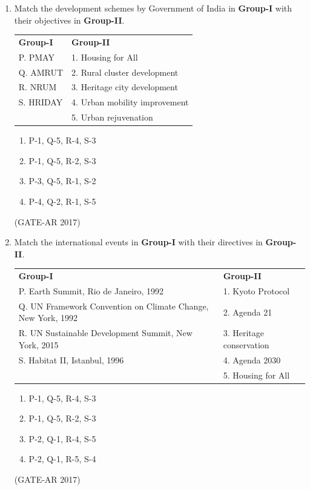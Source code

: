 \documentclass[a4paper,10pt]{article}
\begin{document}
\begin{enumerate}
    \item Match the development schemes by Government of India in \textbf{Group-I} with their objectives in \textbf{Group-II}. \\
    \begin{tabular}{ l l }
	\textbf{Group-I} & \textbf{Group-II} \\
	P. PMAY & 1. Housing for All \\
	Q. AMRUT & 2. Rural cluster development \\
	R. NRUM & 3. Heritage city development \\
	S. HRIDAY & 4. Urban mobility improvement \\
	& 5. Urban rejuvenation \\
	\end{tabular}
	\begin{multicols}{2}
	\begin{enumerate}
        \item P-1, Q-5, R-4, S-3
        \item P-1, Q-5, R-2, S-3
        \item P-3, Q-5, R-1, S-2
        \item P-4, Q-2, R-1, S-5
    \end{enumerate}
	\end{multicols}
    \hfill (GATE-AR 2017)

    \item Match the international events in \textbf{Group-I} with their directives in \textbf{Group-II}. \\
    \begin{tabular}{ l l }
	\textbf{Group-I} & \textbf{Group-II} \\
	P. Earth Summit, Rio de Janeiro, 1992 & 1. Kyoto Protocol \\
	Q. UN Framework Convention on Climate Change, New York, 1992 & 2. Agenda 21 \\
	R. UN Sustainable Development Summit, New York, 2015 & 3. Heritage conservation \\
	S. Habitat II, Istanbul, 1996 & 4. Agenda 2030 \\
	& 5. Housing for All \\
	\end{tabular}
	\begin{multicols}{2}
	\begin{enumerate}
        \item P-1, Q-5, R-4, S-3
        \item P-1, Q-5, R-2, S-3
        \item P-2, Q-1, R-4, S-5
        \item P-2, Q-1, R-5, S-4
    \end{enumerate}
	\end{multicols}
    \hfill (GATE-AR 2017)


\end{enumerate}
\end{document}
